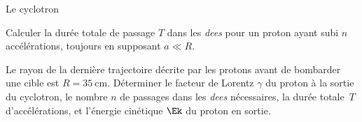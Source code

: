 \begin{exo}[PC][2][TD]{Le cyclotron}
\begin{quest}
{    }
    \item Calculer la durée totale de passage $T$ dans les \emph{dees} pour un proton ayant subi $n$ accélérations, toujours en supposant $a \ll R$.
    \item Le rayon de la dernière trajectoire décrite par les protons avant de bombarder une cible est $R=35 \mathrm{~cm}$. Déterminer le facteur de Lorentz $\gamma$ du proton à la sortie du cyclotron, le nombre $n$ de passages dans les \emph{dees} nécessaires, la durée totale~$T$ d'accélérations, et l'énergie cinétique $\Ek$ du proton en sortie.
\end{quest}
\end{exo}

